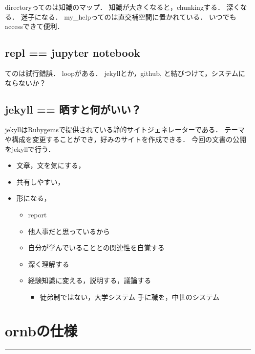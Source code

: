 \documentclass[12pt,a4]{jreport}%
\begin{document}
directoryってのは知識のマップ．
知識が大きくなると，chunkingする．
深くなる．
迷子になる．
my\_helpってのは直交補空間に置かれている．
いつでもaccessできて便利．

\section{repl == jupyter notebook}
\label{sec:orgc36fa9b}
てのは試行錯誤．
loopがある．
jekyllとか，github, と結びつけて，システムにならないか？

\section{jekyll == 晒すと何がいい？}
\label{sec:org2c71569}
jekyllはRubygemsで提供されている静的サイトジェネレーターである．
テーマや構成を変更することができ，好みのサイトを作成できる．
今回の文書の公開をjekyllで行う．
\begin{itemize}
\item 文章，文を気にする，
\item 共有しやすい，
\item 形になる，
\begin{itemize}
\item report
\item 他人事だと思っているから
\item 自分が学んでいることとの関連性を自覚する
\item 深く理解する
\item 経験知識に変える，説明する，議論する
\begin{itemize}
\item 徒弟制ではない，大学システム
手に職を，中世のシステム
\end{itemize}
\end{itemize}
\end{itemize}

\chapter{ornbの仕様}
\label{sec:org1b90e46}


\noindent\rule{\textwidth}{0.5pt}
\end{document}

